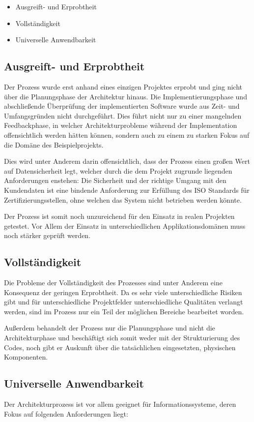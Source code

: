 \begin{itemize}
  \item Ausgreift- und Erprobtheit
  \item Vollständigkeit
  \item Universelle Anwendbarkeit
\end{itemize}

\subsection{Ausgreift- und Erprobtheit}
Der Prozess wurde erst anhand eines einzigen Projektes erprobt und ging nicht über die Planungsphase der Architektur hinaus. Die Implementierungsphase und abschließende Überprüfung der implementierten Software wurde aus Zeit- und Umfangsgründen nicht durchgeführt. Dies führt nicht nur zu einer mangelnden Feedbackphase, in welcher Architekturprobleme während der Implementation offensichtlich werden hätten können, sondern auch zu einem zu starken Fokus auf die Domäne des Beispielprojekts.

Dies wird unter Anderem darin offensichtlich, dass der Prozess einen großen Wert auf Datensicherheit legt, welcher durch die dem Projekt zugrunde liegenden Anforderungen enstehen: Die Sicherheit und der richtige Umgang mit den Kundendaten ist eine bindende Anforderung zur Erfüllung des ISO Standards für Zertifizierungsstellen, ohne welchen das System nicht betrieben werden könnte. \cite{ISO_CERT}

Der Prozess ist somit noch unzureichend für den Einsatz in realen Projekten getestet. Vor Allem der Einsatz in unterschiedlichen Applikationsdomänen muss noch stärker geprüft werden.

\subsection{Vollständigkeit}
Die Probleme der Vollständigkeit des Prozesses sind unter Anderem eine Konsequenz der geringen Erprobtheit. Da es sehr viele unterschiedliche Risiken gibt und für unterschiedliche Projektfelder unterschiedliche Qualitäten verlangt werden, sind im Prozess nur ein Teil der möglichen Bereiche bearbeitet worden.

Außerdem behandelt der Prozess nur die Planungsphase und nicht die Architekturphase und beschäftigt sich somit weder mit der Strukturierung des Codes, noch gibt er Auskunft über die tatsächlichen eingesetzten, physischen Komponenten.


\subsection{Universelle Anwendbarkeit}
Der Architekturprozess ist vor allem geeignet für Informationssysteme, deren Fokus auf folgenden Anforderungen liegt:

